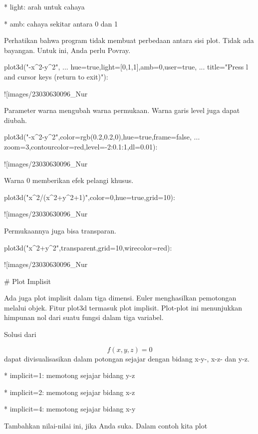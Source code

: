 \documentclass{article}
\begin{document}
* 
light: arah untuk cahaya

* 
amb: cahaya sekitar antara 0 dan 1


Perhatikan bahwa program tidak membuat perbedaan antara sisi plot.
Tidak ada bayangan. Untuk ini, Anda perlu Povray.


\>plot3d("-x^2-y^2", ...  
\>     hue=true,light=[0,1,1],amb=0,user=true, ...  
\>     title="Press l and cursor keys (return to exit)"):


![images/23030630096_Nur%

Parameter warna mengubah warna permukaan. Warna garis level juga dapat
diubah.


\>plot3d("-x^2-y^2",color=rgb(0.2,0.2,0),hue=true,frame=false, ...  
\>     zoom=3,contourcolor=red,level=-2:0.1:1,dl=0.01):


![images/23030630096_Nur%

Warna 0 memberikan efek pelangi khusus.


\>plot3d("x^2/(x^2+y^2+1)",color=0,hue=true,grid=10):


![images/23030630096_Nur%

Permukaannya juga bisa transparan.


\>plot3d("x^2+y^2",\>transparent,grid=10,wirecolor=red):


![images/23030630096_Nur%

# Plot Implisit

Ada juga plot implisit dalam tiga dimensi. Euler menghasilkan
pemotongan melalui objek. Fitur plot3d termasuk plot implisit.
Plot-plot ini menunjukkan himpunan nol dari suatu fungsi dalam tiga
variabel.


Solusi dari


$$f(x,y,z) = 0$$dapat divisualisasikan dalam potongan sejajar dengan bidang x-y-, x-z-
dan y-z.


* 
implicit=1: memotong sejajar bidang y-z

* 
implicit=2: memotong sejajar bidang x-z

* 
implicit=4: memotong sejajar bidang x-y


Tambahkan nilai-nilai ini, jika Anda suka. Dalam contoh kita plot
\end{document}
